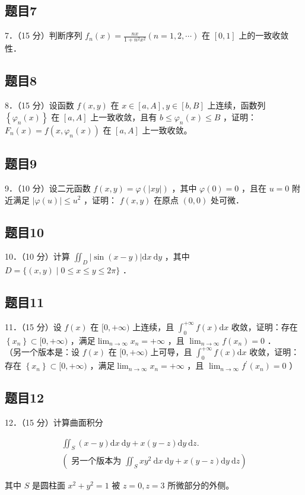 \documentclass{article}
\begin{document}
\subsection{题目7}
7．（15 分）判断序列 \(f_{n}(x)=\frac{n x}{1+n^{2} x^{2}}(n=1,2, \cdots)\) 在 \([0,1]\) 上的一致收敛性．

\subsection{题目8}
8．（15 分）设函数 \(f(x, y)\) 在 \(x \in[a, A], y \in[b, B]\) 上连续，函数列 \(\left\{\varphi_{n}(x)\right\}\) 在 \([a, A]\) 上一致收敛，且有 \(b \leq \varphi_{n}(x) \leq B\) ，证明：\(F_{n}(x)=f\left(x, \varphi_{n}(x)\right)\) 在 \([a, A]\) 上一致收敛。

\subsection{题目9}
9．（10 分）设二元函数 \(f(x, y)=\varphi(|x y|)\) ，其中 \(\varphi(0)=0\) ，且在 \(u=0\) 附近满足 \(|\varphi(u)| \leq u^{2}\) ，证明： \(f(x, y)\) 在原点 \((0,0)\) 处可微．

\subsection{题目10}
10．（10 分）计算 \(\iint_{D}|\sin (x-y)| \mathrm{d} x \mathrm{~d} y\) ，其中 \(D=\{(x, y) \mid 0 \leq x \leq y \leq 2 \pi\}\) ．

\subsection{题目11}
11．（15 分）设 \(f(x)\) 在 \([0,+\infty)\) 上连续，且 \(\int_{0}^{+\infty} f(x) \mathrm{d} x\) 收敛，证明：存在 \(\left\{x_{n}\right\} \subset[0,+\infty)\) ，满足\(\lim _{n \rightarrow \infty} x_{n}=+\infty\) ，且 \(\lim _{n \rightarrow \infty} f\left(x_{n}\right)=0\) ．\\
（另一个版本是：设 \(f(x)\) 在 \([0,+\infty)\) 上可导，且 \(\int_{0}^{+\infty} f(x) \mathrm{d} x\) 收敛，证明：存在 \(\left\{x_{n}\right\} \subset[0,+\infty)\) ，满足\(\lim _{n \rightarrow \infty} x_{n}=+\infty\) ，且 \(\lim _{n \rightarrow \infty} f^{\prime}\left(x_{n}\right)=0\) ）

\subsection{题目12}
12．（15 分）计算曲面积分

\[
\begin{gathered}
\iint_{S}(x-y) \mathrm{d} x \mathrm{~d} y+x(y-z) \mathrm{d} y \mathrm{~d} z . \\
\left(\text { 另一个版本为 } \iint_{S} x y^{2} \mathrm{~d} x \mathrm{~d} y+x(y-z) \mathrm{d} y \mathrm{~d} z\right)
\end{gathered}
\]

其中 \(S\) 是圆柱面 \(x^{2}+y^{2}=1\) 被 \(z=0, z=3\) 所微部分的外侧。
\end{document}
